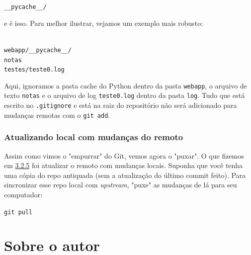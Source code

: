 \documentclass{article}
\begin{document}
  \vspace{1ex}
  \texttt{\_\_pycache\_\_/}
  \vspace{1ex}

  e é isso. Para melhor ilustrar, vejamos um exemplo mais robusto: 
  
  \vspace{1ex}
  \texttt{\\ 
  \noindent webapp/\_\_pycache\_\_/  \\ 
  \noindent notas \\ 
  \noindent testes/teste0.log}
  \vspace{1ex}

  Aqui, ignoramos a pasta cache do Python dentro da pasta \texttt{webapp}, o arquivo de texto \texttt{notas} e o arquivo 
  de log \texttt{teste0.log} dentro da pasta \texttt{log}. Tudo que está escrito no \texttt{.gitignore} e está na raiz 
  do repositório não será adicionado para mudanças remotas com o \texttt{git add}.
  
  
  \subsubsection{Atualizando local com mudanças do remoto}

  Assim como vimos o "empurrar" do Git, vemos agora o "puxar". O que fizemos em \href{sec:push}{3.2.5} foi atualizar o remoto com 
  mudanças locais. Suponha que você tenha uma cópia do repo antiquada (sem a atualização do último commit feito). Para sincronizar 
  esse repo local com \textit{upstream}, "puxe" as mudanças de lá para seu computador: 

  \vspace{1ex}
  \texttt{git pull}
  \vspace{1ex}
 

  

  \newpage
  \section{Sobre o autor}
\end{document}
